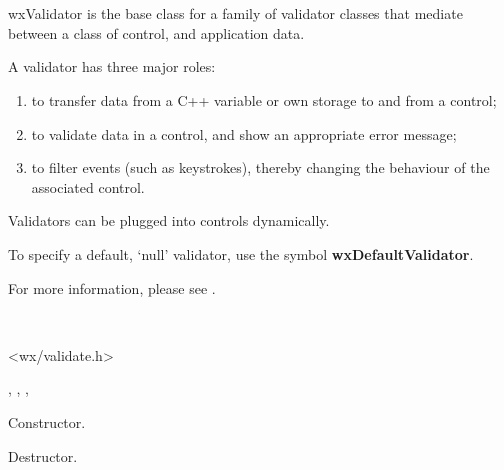 \section{}\label{wxvalidator}

wxValidator is the base class for a family of validator classes that mediate
between a class of control, and application data.

A validator has three major roles:

\begin{enumerate}\itemsep=0pt
\item to transfer data from a C++ variable or own storage to and from a control;
\item to validate data in a control, and show an appropriate error message;
\item to filter events (such as keystrokes), thereby changing the behaviour of the
associated control.
\end{enumerate}

Validators can be plugged into controls dynamically.

To specify a default, `null' validator, use the symbol {\bf wxDefaultValidator}.

For more information, please see .


\\


<wx/validate.h>


, 
,
,



\label{wxvalidatorconstr}


Constructor.



Destructor.

\label{wxvalidatorclone}

